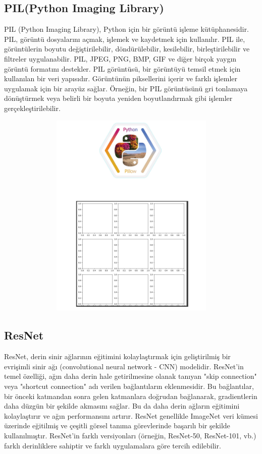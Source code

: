 \documentclass[12pt]{article}
\begin{document}
\subsection{PIL(Python Imaging Library)}
PIL (Python Imaging Library), Python için bir görüntü işleme kütüphanesidir. PIL, görüntü dosyalarını açmak, işlemek ve kaydetmek için kullanılır. PIL ile, görüntülerin boyutu değiştirilebilir, döndürülebilir, kesilebilir, birleştirilebilir ve filtreler uygulanabilir. PIL, JPEG, PNG, BMP, GIF ve diğer birçok yaygın görüntü formatını destekler. PIL görüntüsü, bir görüntüyü temsil etmek için kullanılan bir veri yapısıdır. Görüntünün piksellerini içerir ve farklı işlemler uygulamak için bir arayüz sağlar. Örneğin, bir PIL görüntüsünü gri tonlamaya dönüştürmek veya belirli bir boyuta yeniden boyutlandırmak gibi işlemler gerçekleştirilebilir.
\begin{figure}[h]
    \centering
    \includegraphics[width=7\textwidth, height=10cm, keepaspectratio]{pıl.png}
    \label{fig:enter-label}
\end{figure}
\subsection{ResNet}
ResNet, derin sinir ağlarının eğitimini kolaylaştırmak için geliştirilmiş bir evrişimli sinir ağı (convolutional neural network - CNN) modelidir. ResNet'in temel özelliği, ağın daha derin hale getirilmesine olanak tanıyan "skip connection" veya "shortcut connection" adı verilen bağlantıların eklenmesidir. Bu bağlantılar, bir önceki katmandan sonra gelen katmanlara doğrudan bağlanarak, gradientlerin daha düzgün bir şekilde akmasını sağlar. Bu da daha derin ağların eğitimini kolaylaştırır ve ağın performansını artırır. ResNet genellikle ImageNet veri kümesi üzerinde eğitilmiş ve çeşitli görsel tanıma görevlerinde başarılı bir şekilde kullanılmıştır. ResNet'in farklı versiyonları (örneğin, ResNet-50, ResNet-101, vb.) farklı derinliklere sahiptir ve farklı uygulamalara göre tercih edilebilir.\cite{OpenAI}
\end{document}
